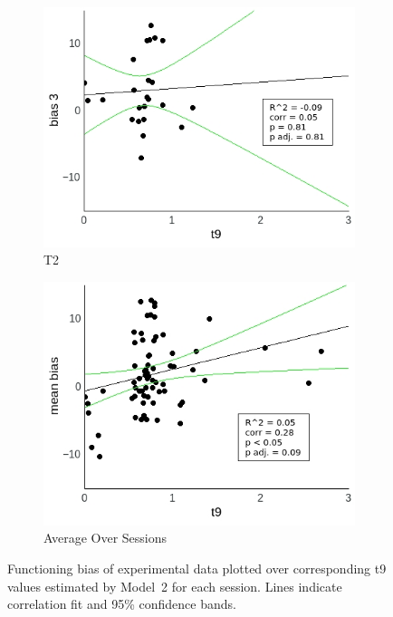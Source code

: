 \documentclass[a4paper]{scrreprt}
\begin{document}
\begin{figure}
\begin{subfigure}[b]{0.49\textwidth}
        \includegraphics[width=\textwidth]{figs/sec3/t9/t9_diff_3_mod2dat.jpeg}
        \caption{T2}
    \end{subfigure}
    \begin{subfigure}[b]{0.49\textwidth}
        \includegraphics[width=\textwidth]{figs/sec3/t9/t9_diff_mean_mod2dat.jpeg}
        \caption{Average Over Sessions}
    \end{subfigure}
\caption{Functioning bias of experimental data plotted over corresponding t9 values estimated by Model~2 for each session. Lines indicate correlation fit and 95\% confidence bands.}
\label{fig:t9_diff_mod2dat}
\end{figure}
\end{document}
